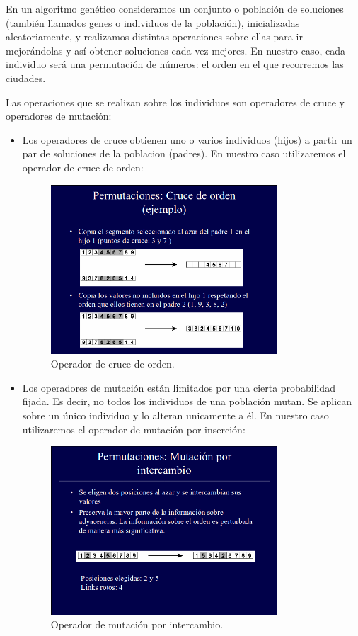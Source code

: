 \documentclass{article}
\begin{document}
En un algoritmo genético consideramos un conjunto o población de
soluciones (también llamados genes o individuos de la población),
inicializadas aleatoriamente, y realizamos distintas operaciones sobre
ellas para ir mejorándolas y así obtener soluciones cada vez
mejores. En nuestro caso, cada individuo será una permutación de
números: el orden en el que recorremos las ciudades.

Las operaciones que se realizan sobre los individuos son operadores de
cruce y operadores de mutación:
\begin{itemize}
\item Los operadores de cruce obtienen uno o varios individuos (hijos)
  a partir un par de soluciones de la poblacion (padres). En nuestro
  caso utilizaremos el operador de cruce de orden:
	
	\begin{figure}[H]
		\centering
		\includegraphics[width=0.8\textwidth]{imag1.png}
		\caption{Operador de cruce de orden.}
	\end{figure}
	
      \item Los operadores de mutación están limitados por una cierta
        probabilidad fijada. Es decir, no todos los individuos de una
        población mutan. Se aplican sobre un único individuo y lo
        alteran unicamente a él. En nuestro caso utilizaremos el
        operador de mutación por inserción:
	
	\begin{figure}[H]
		\centering
		\includegraphics[width=0.8\textwidth]{imag2.png}
		\caption{Operador de mutación por intercambio.}
	\end{figure}
	
\end{itemize}
 
\end{document}
